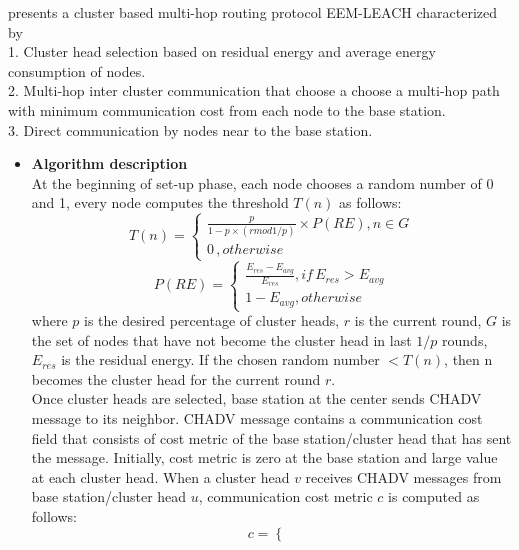 \documentclass[11pt]{report}
\begin{document}
	\cite{6993070} presents a cluster based multi-hop routing protocol EEM-LEACH characterized by \\
	1. Cluster head selection based on residual energy and average energy consumption of nodes.\\
	2. Multi-hop inter cluster communication that choose a choose a multi-hop path with minimum communication cost from each node to the base station. \\
	3. Direct communication by nodes near to the base station. 
	\begin{itemize}
		\item \textbf{Algorithm description}\\
		At the beginning of set-up phase, each node chooses a random number of 0 and 1, every node computes the threshold $T(n)$ as follows:\\
		\begin{equation}
		T(n) = \left\{ \begin{array}{ll}
		\frac{p}{1-p \times \left(r mod 1/p\right)}\times P\left(RE\right), n \in G\\
		0         \,                      ,otherwise
		\end{array} \right.
		\end{equation}
		\begin{equation}
		P(RE) = \left\{ \begin{array}{ll}
		\frac{E_{res}-E_{avg}}{E_{res}},if \, E_{res} > E_{avg}\\
		1-E_{avg}, otherwise 
		\end{array} \right.
		\end{equation}
		where $p$ is the desired percentage of cluster heads, $r$ is the current round, $G$ is the set of nodes that have not become the cluster head in last $1/p$ rounds, $E_{res}$ is the residual energy. If the chosen random number $< T(n)$, then n becomes the cluster head for the current round $r$. \\
		Once cluster heads are selected, base station at the center sends CHADV message to its neighbor. CHADV message contains a communication cost field that consists of cost metric of the base station/cluster head that has sent the message. Initially, cost metric is zero at the base station and large value at each cluster head. When a cluster head $v$ receives CHADV messages from base station/cluster head $u$, communication cost metric $c$ is computed as follows:
		\begin{equation}
		c = \left\{ \begin{array}{ll}

\end{array}
\end{equation}
\end{itemize}
\end{document}
